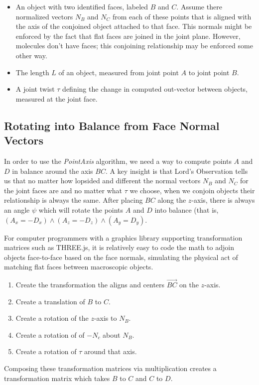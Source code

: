 \documentclass[11pt]{article}
\begin{document}
{\begin{itemize}
\item An object with two identified faces, labeled $B$ and $C$. Assume there normalized
  vectors $N_B$ and $N_C$
  from each of these points that is aligned with the axis of the conjoined object attached to
  that face. This normals might be enforced by the fact that flat faces are joined in the joint plane.
  However, molecules don't have faces; this conjoining relationship may be enforced some other way.
\item The length $L$ of an object, measured from joint point $A$ to joint point $B$.
\item A joint twist $\tau$ defining the change in computed out-vector between objects,
  measured at the joint face.
\end{itemize}

\subsection{Rotating into Balance from Face Normal Vectors}

\label{sec:balance}

In order to use the {\em PointAxis} algorithm, we need a way
to compute points $A$ and $D$ in balance around the axis $BC$.
A key insight is that Lord's Observation tells us that no matter how lopsided and different
the normal vectors  $N_B$ and $N_C$ for the joint faces are and no matter what $\tau$ we choose,
when we conjoin objects
their relationship is always the same.
After placing $BC$ along
the $z$-axis, there is always an angle $\psi$ which will
rotate the points $A$ and $D$ into balance (that is, $(A_x = -D_x) \wedge (A_z = -D_z) \wedge (A_y = D_y)$.

For computer programmers with a graphics library supporting transformation matrices such
as THREE.js\cite{dirksen2013learning},
it is relatively easy to code the math to adjoin objects
face-to-face based on the face normals, simulating the physical act of
matching flat faces between macroscopic objects.
\begin{enumerate}
  \item Create the transformation the aligns and centers $\overrightarrow{BC}$ on the $z$-axis.
\item Create a translation of $B$ to $C$.
\item Create a rotation of the $z$-axis to  $N_B$.
\item Create a rotation of of $-N_c$ about $N_B$.
  \item Create a rotation of $\tau$ around that axis.
\end{enumerate}
Composing these transformation matrices via multiplication creates a
transformation matrix which takes $B$ to $C$ and $C$ to $D$.

}
\end{document}

